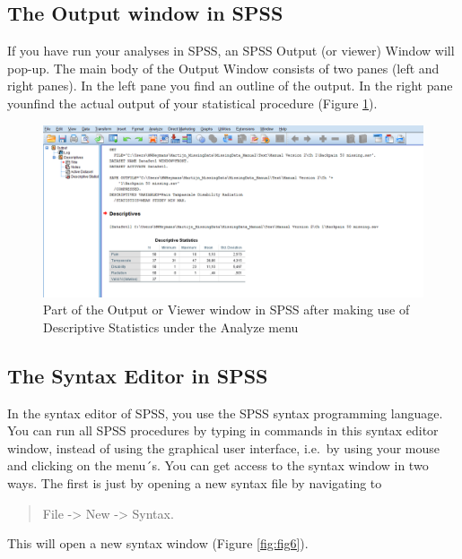 \documentclass[]{book}
\begin{document}
\subsection{The Output window in SPSS}\label{the-output-window-in-spss}

If you have run your analyses in SPSS, an SPSS Output (or viewer) Window
will pop-up. The main body of the Output Window consists of two panes
(left and right panes). In the left pane you find an outline of the
output. In the right pane younfind the actual output of your statistical
procedure (Figure \ref{fig:fig5}).

\begin{figure}

{\centering \includegraphics[width=0.95\linewidth]{images/fig1.5} 

}

\caption{Part of the Output or Viewer window in SPSS after making use of Descriptive Statistics under the Analyze menu}\label{fig:fig5}
\end{figure}

\subsection{The Syntax Editor in SPSS}\label{the-syntax-editor-in-spss}

In the syntax editor of SPSS, you use the SPSS syntax programming
language. You can run all SPSS procedures by typing in commands in this
syntax editor window, instead of using the graphical user interface,
i.e.~by using your mouse and clicking on the menu´s. You can get access
to the syntax window in two ways. The first is just by opening a new
syntax file by navigating to

\begin{quote}
File -\textgreater{} New -\textgreater{} Syntax.
\end{quote}

This will open a new syntax window (Figure \ref{fig:fig6}).
\end{document}
